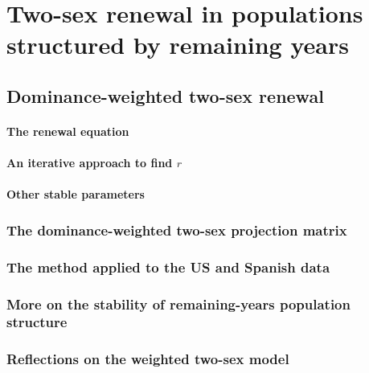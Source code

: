 \part*{Two-sex renewal in populations structured by remaining years}
  
  
  \chapter{Dominance-weighted two-sex renewal}
    
    \subsection{The renewal equation}
      
    \subsection{An iterative approach to find $r$}
      
    \subsection{Other stable parameters}
      
  \section{The dominance-weighted two-sex projection matrix}
      
  \section{The method applied to the US and Spanish data}
      
  \section{More on the stability of remaining-years population structure}
    
  \section{Reflections on the weighted two-sex model}
      
  
